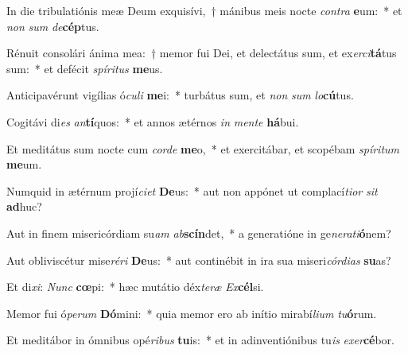 \item In die tribulatiónis meæ Deum exquisívi,~† mánibus meis nocte \textit{con}\textit{tra} \textbf{e}um:~* et \textit{non} \textit{sum} \textit{de}\textbf{cép}tus.
\item Rénuit consolári ánima mea:~† memor fui Dei, et delectátus sum, et ex\textit{er}\textit{ci}\textbf{tá}tus sum:~* et defécit \textit{spí}\textit{ri}\textit{tus} \textbf{me}us.
\item Anticipavérunt vigílias ó\textit{cu}\textit{li} \textbf{me}i:~* turbátus sum, et \textit{non} \textit{sum} \textit{lo}\textbf{cú}tus.
\item Cogitávi di\textit{es} \textit{an}\textbf{tí}quos:~* et annos ætérnos \textit{in} \textit{men}\textit{te} \textbf{há}bui.
\item Et meditátus sum nocte cum \textit{cor}\textit{de} \textbf{me}o,~* et exercitábar, et scopébam \textit{spí}\textit{ri}\textit{tum} \textbf{me}um.
\item Numquid in ætérnum projí\textit{ci}\textit{et} \textbf{De}us:~* aut non appónet ut complací\textit{ti}\textit{or} \textit{sit} \textbf{ad}huc?
\item Aut in finem misericórdiam su\textit{am} \textit{ab}\textbf{scín}det,~* a generatióne in ge\textit{ne}\textit{ra}\textit{ti}\textbf{ó}nem?
\item Aut obliviscétur mise\textit{ré}\textit{ri} \textbf{De}us:~* aut continébit in ira sua miseri\textit{cór}\textit{di}\textit{as} \textbf{su}as?
\item Et di\textit{xi}: \textit{Nunc} \textbf{cœ}pi:~* hæc mutátio déx\textit{te}\textit{ræ} \textit{Ex}\textbf{cél}si.
\item Memor fui ó\textit{pe}\textit{rum} \textbf{Dó}mini:~* quia memor ero ab inítio mirabí\textit{li}\textit{um} \textit{tu}\textbf{ó}rum.
\item Et meditábor in ómnibus opé\textit{ri}\textit{bus} \textbf{tu}is:~* et in adinventiónibus tu\textit{is} \textit{ex}\textit{er}\textbf{cé}bor.
